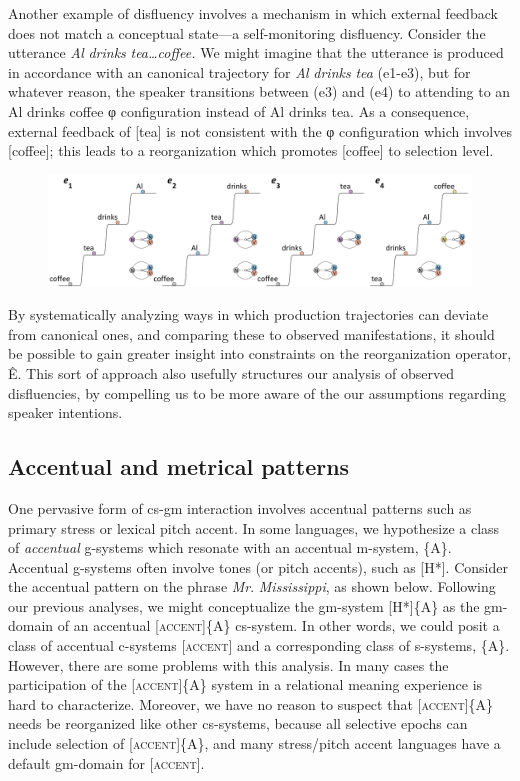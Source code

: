   Another example of disfluency involves a mechanism in which external feedback does not match a conceptual state—a self-monitoring disfluency. Consider the utterance \textit{Al} \textit{drinks} \textit{tea…coffee.} We might imagine that the utterance is produced in accordance with an canonical trajectory for \textit{Al} \textit{drinks} \textit{tea} (e1-e3), but for whatever reason, the speaker transitions between (e3) and (e4) to attending to an {\textbar}Al drinks coffee{\textbar} φ configuration instead of {\textbar}Al drinks tea{\textbar}. As a consequence, external feedback of [tea] is not consistent with the φ configuration which involves [coffee]; this leads to a reorganization which promotes [coffee] to selection level.

  
\begin{figure}
\includegraphics[width=\textwidth]{figures/Tilsen-img62.png}
\caption{\missingcaption}
\label{fig:}
\end{figure}
 

  By systematically analyzing ways in which production trajectories can deviate from canonical ones, and comparing these to observed manifestations, it should be possible to gain greater insight into constraints on the reorganization operator, Ê. This sort of approach also usefully structures our analysis of observed disfluencies, by compelling us to be more aware of the our assumptions regarding speaker intentions.

\subsection{Accentual and metrical patterns}

One pervasive form of cs-gm interaction involves accentual patterns such as primary stress or lexical pitch accent. In some languages, we hypothesize a class of \textit{accentual} g-systems which resonate with an accentual m-system, \{A\}. Accentual g-systems often involve tones (or pitch accents), such as [H*]. Consider the accentual pattern on the phrase \textit{Mr}. \textit{Mississippi}, as shown below. Following our previous analyses, we might conceptualize the gm-system [H*]\{A\} as the gm-domain of an accentual [\textsc{accent}]\{A\} cs-system. In other words, we could posit a class of accentual c-systems [\textsc{accent}] and a corresponding class of s-systems, \{A\}. However, there are some problems with this analysis. In many cases the participation of the [\textsc{accent}]\{A\} system in a relational meaning experience is hard to characterize. Moreover, we have no reason to suspect that [\textsc{accent}]\{A\} needs be reorganized like other cs-systems, because all selective epochs can include selection of [\textsc{accent}]\{A\}, and many stress/pitch accent languages have a default gm-domain for [\textsc{accent}].


